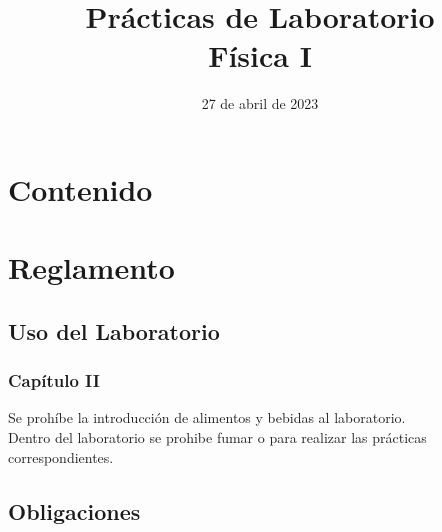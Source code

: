 \documentclass[14pt]{beamer}
\title{\Large{Prácticas de Laboratorio} \\ \normalsize{Física I}}
\date{27 de abril de 2023}
\begin{document}
\maketitle

\section*{Contenido}

\section{Reglamento}
\subsection{Uso del Laboratorio}

\begin{frame}
\frametitle{Capítulo II}
 \pause Se prohíbe la introducción de alimentos y bebidas al laboratorio.
\\
\bigskip
\pause
{} \pause Dentro del laboratorio se prohibe fumar o  para realizar las prácticas correspondientes.
\end{frame}

\subsection{Obligaciones}
\end{document}
